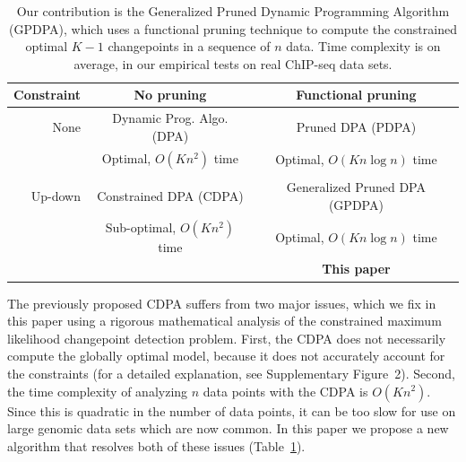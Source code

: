 \documentclass[twoside,11pt]{article}
\begin{document}

\begin{table}[t!]
  \centering
  \begin{tabular}{r|c|c}
    Constraint & No pruning & Functional pruning \\
    \hline
    None & Dynamic Prog. Algo. (DPA) & Pruned DPA (PDPA) \\
    & Optimal, $O(Kn^2)$ time & Optimal, $O(Kn\log n)$ time\\
    & \citet{segment-neighborhood}     & \citet{pruned-dp, phd-johnson} \\
    \hline
    Up-down & Constrained DPA (CDPA) & Generalized Pruned DPA (GPDPA) \\
    & Sub-optimal, $O(Kn^2)$ time & Optimal, $O(Kn\log n)$ time\\
    & \citet{HOCKING-PeakSeg} & \textbf{This paper} \\
    \hline
  \end{tabular}
  \caption{Our contribution is 
the Generalized Pruned Dynamic Programming Algorithm (GPDPA), 
 which uses a functional pruning technique 
    to compute the constrained optimal $K-1$ changepoints 
in a sequence of $n$ data. 
Time complexity is on average, 
in our empirical tests on real ChIP-seq data sets.}
\label{tab:contribution}
\end{table}

The previously proposed CDPA suffers from two major issues, which we fix in
this paper using a rigorous mathematical analysis of the constrained
maximum likelihood changepoint detection problem. First, the CDPA does
not necessarily compute the globally optimal model, because it does
not accurately account for the constraints (for a detailed
explanation, see Supplementary Figure~2). Second, the time complexity
of analyzing $n$ data points with the CDPA is $O(Kn^2)$. Since this is quadratic in the number of
data points, it can be too slow for use on large genomic data sets
which are now common. In this paper we propose a new algorithm that
resolves both of these issues (Table~\ref{tab:contribution}).
\end{document}
